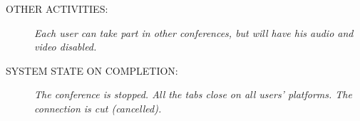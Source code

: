 \begin{description}
 \item [OTHER ACTIVITIES:]
  \textit{Each user can take part in other conferences, but will have his audio and video disabled.}

 \item [SYSTEM STATE ON COMPLETION:]
  \textit{The conference is stopped. All the tabs close on all users' platforms. The connection is cut (cancelled).}
\end{description}

